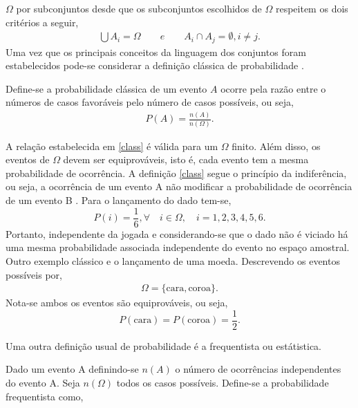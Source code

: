 $\Omega$ por subconjuntos desde que os subconjuntos escolhidos de $\Omega$ respeitem os dois crit\'erios a
seguir, 
	\begin{align*}
		\bigcup A_i = \Omega \qquad \textit{e} \qquad A_i \cap A_j = \emptyset, i \neq j.
	\end{align*}
Uma vez que os principais conceitos da linguagem dos conjuntos foram estabelecidos pode-se
considerar a defini\c c\~ao cl\'assica de probabilidade \cite{james}. 
	\begin{defin} 
		\label{class}
		Define-se a probabilidade cl\'assica de um evento $A$ ocorre pela raz\~ao entre o n\'umeros de casos
		favor\'aveis pelo n\'umero de casos poss\'iveis, ou seja, 
		\begin{align}
			P(A) = \frac{n(A)}{n(\Omega)}.
		\end{align} 
	\end{defin}
A rela\c c\~ao estabelecida em \ref{class} \'e v\'alida para um $\Omega$
finito. Al\'em disso, os eventos de $\Omega$ devem ser equiprov\'{a}veis, isto \'e, cada evento tem a
mesma probabilidade de ocorr\^{e}ncia.  A defini\c c\~ao \autoref{class} segue o princ\'ipio da
indifer\^encia, ou seja, a ocorr\^{e}ncia de um evento A n\~{a}o modificar a probabilidade de
ocorr\^{e}ncia de um evento B \cite{james}.  Para o lan\c{c}amento do dado tem-se, 
	\begin{equation*}
		P(i)= \frac{1}{6},\forall \quad i \in \Omega, \quad i = 1,2,3,4,5,6.
	\end{equation*} 
Portanto, independente da jogada e considerando-se que o dado n\~{a}o \'{e} viciado h\'a uma mesma probabilidade
associada independente do evento no espa\c{c}o amostral. Outro exemplo cl\'{a}ssico e o lan\c{c}amento de
uma moeda.  Descrevendo os eventos poss\'{i}veis por, 
	\begin{align*}
		\Omega = \{ \textrm{cara},
		\textrm{coroa} \}.  
	\end{align*}
Nota-se ambos os eventos s\~ao equiprov\'{a}veis, ou seja,
	\begin{equation*}
		P(\textrm{cara}) = P(\textrm{coroa}) = \frac{1}{2}.  
	\end{equation*} 
	\par
Uma outra defini\c c\~ao usual de probabilidade \'e a frequentista ou est\'{a}tistica.  
	\begin{defin}
		\label{freq}
		Dado um evento A definindo-se $n(A)$ o n\'umero de ocorr\^encias independentes do evento A.  Seja
		$n(\Omega)$ todos os casos poss\'{i}veis. Define-se a probabilidade frequentista como, 
	\end{defin}
